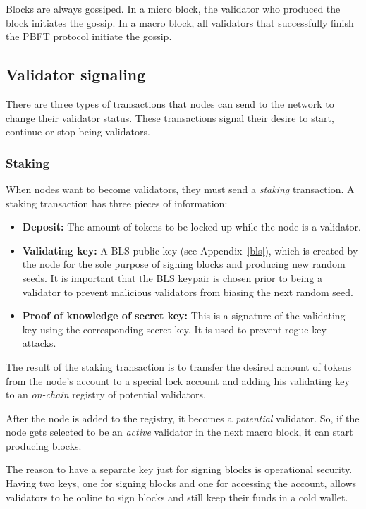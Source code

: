 \documentclass[conference]{IEEEtran}
\begin{document}
Blocks are always gossiped. In a micro block, the validator who produced the block initiates the gossip. In a macro block, all validators that successfully finish the PBFT protocol initiate the gossip.

\subsection{Validator signaling}
There are three types of transactions that nodes can send to the network to change their validator status. These transactions signal their desire to start, continue or stop being validators.

\subsubsection{Staking}
When nodes want to become validators, they must send a \textit{staking} transaction. A staking transaction has three pieces of information:

\begin{itemize}
	\item \textbf{Deposit:} The amount of tokens to be locked up while the node is a validator.
	\item \textbf{Validating key:} A BLS public key (see Appendix~\ref{bls}), which is created by the node for the sole purpose of signing blocks and producing new random seeds. It is important that the BLS keypair is chosen prior to being a validator to prevent malicious validators from biasing the next random seed.
	\item \textbf{Proof of knowledge of secret key:} This is a signature of the validating key using the corresponding secret key. It is used to prevent rogue key attacks.
\end{itemize}

The result of the staking transaction is to transfer the desired amount of tokens from the node's account to a special lock account and adding his validating key to an \textit{on-chain} registry of potential validators.

After the node is added to the registry, it becomes a \textit{potential} validator. So, if the node gets selected to be an \textit{active} validator in the next macro block, it can start producing blocks.

The reason to have a separate key just for signing blocks is operational security. Having two keys, one for signing blocks and one for accessing the account, allows validators to be online to sign blocks and still keep their funds in a cold wallet.
\end{document}
